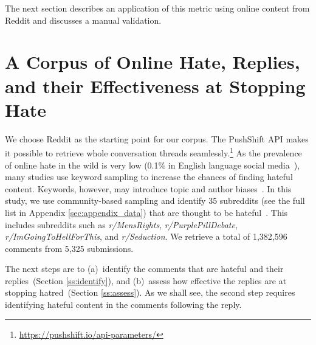 \documentclass[11pt]{article}
\begin{document}
The next section describes an application of this metric using online content from Reddit
and discusses a manual validation.


\section{A Corpus of Online Hate, Replies, and their Effectiveness at Stopping Hate}
\label{s:corpus}

We choose Reddit as the starting point for our corpus.
The PushShift API makes it possible to retrieve whole conversation threads seamlessly.\footnote{\url{https://pushshift.io/api-parameters/}}
As the prevalence of online hate in the wild is very low (0.1\% in English language social media~\cite{vidgen-etal-2019-challenges}), many studies use keyword sampling to increase the chances of finding hateful content. 
Keywords, however, may introduce topic and author biases~\cite{wiegand-etal-2019-detection,vidgen-etal-2021-introducing}. 
In this study, we use community-based sampling and identify
35 subreddits (see the full list in Appendix \ref{sec:appendix_data}) that are thought to be hateful~\cite{qian-etal-2019-benchmark,guest-etal-2021-expert,vidgen-etal-2021-introducing}. 
This includes subreddits such as \textit{r/MensRights},  \textit{r/PurplePillDebate}, \textit{r/ImGoingToHellForThis}, and \textit{r/Seduction}.
We retrieve a total of 1,382,596 comments from 5,325 submissions.

The next steps are to 
(a)~identify the comments that are hateful and their replies~(Section \ref{ss:identify}),
and
(b)~assess how effective the replies are at stopping hatred~(Section \ref{ss:assess}).
As we shall see, the second step requires identifying hateful content in the comments following the reply.
\end{document}
